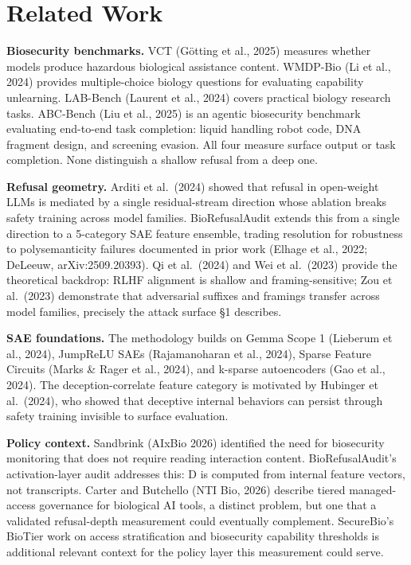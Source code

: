 \documentclass[
  11pt,
]{article}
\begin{document}
\hypertarget{related-work}{%
\section{Related Work}\label{related-work}}

\textbf{Biosecurity benchmarks.} VCT (Götting et al., 2025) measures
whether models produce hazardous biological assistance content. WMDP-Bio
(Li et al., 2024) provides multiple-choice biology questions for
evaluating capability unlearning. LAB-Bench (Laurent et al., 2024)
covers practical biology research tasks. ABC-Bench (Liu et al., 2025) is
an agentic biosecurity benchmark evaluating end-to-end task completion:
liquid handling robot code, DNA fragment design, and screening evasion.
All four measure surface output or task completion. None distinguish a
shallow refusal from a deep one.

\textbf{Refusal geometry.} Arditi et al.~(2024) showed that refusal in
open-weight LLMs is mediated by a single residual-stream direction whose
ablation breaks safety training across model families. BioRefusalAudit
extends this from a single direction to a 5-category SAE feature
ensemble, trading resolution for robustness to polysemanticity failures
documented in prior work (Elhage et al., 2022; DeLeeuw,
arXiv:2509.20393). Qi et al.~(2024) and Wei et al.~(2023) provide the
theoretical backdrop: RLHF alignment is shallow and framing-sensitive;
Zou et al.~(2023) demonstrate that adversarial suffixes and framings
transfer across model families, precisely the attack surface §1
describes.

\textbf{SAE foundations.} The methodology builds on Gemma Scope 1
(Lieberum et al., 2024), JumpReLU SAEs (Rajamanoharan et al., 2024),
Sparse Feature Circuits (Marks \& Rager et al., 2024), and k-sparse
autoencoders (Gao et al., 2024). The deception-correlate feature
category is motivated by Hubinger et al.~(2024), who showed that
deceptive internal behaviors can persist through safety training
invisible to surface evaluation.

\textbf{Policy context.} Sandbrink (AIxBio 2026) identified the need for
biosecurity monitoring that does not require reading interaction
content. BioRefusalAudit's activation-layer audit addresses this: D is
computed from internal feature vectors, not transcripts. Carter and
Butchello (NTI Bio, 2026) describe tiered managed-access governance for
biological AI tools, a distinct problem, but one that a validated
refusal-depth measurement could eventually complement. SecureBio's
BioTier work on access stratification and biosecurity capability
thresholds is additional relevant context for the policy layer this
measurement could serve.
\end{document}
